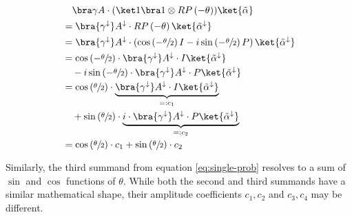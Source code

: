 \begin{equation}
    \label{eq:single-prob-simplification1}
    \begin{split}
            &\quad \bra\gamma A \cdot (\ket 1 \bra 1 \otimes RP\left(-\theta\right)) \ket{\tilde\alpha} \\
            &= \bra{\gamma^\downarrow} A^\downarrow \cdot RP\left(-\theta\right) \ket{\tilde\alpha^\downarrow} \\
            &= \bra{\gamma^\downarrow} A^\downarrow \cdot \left(\cos\left(-\sfrac\theta2\right) I - i \sin\left(-\sfrac\theta2\right) P\right) \ket{\tilde\alpha^\downarrow} \\
            &= \cos\left(-\sfrac\theta2\right) \cdot \bra{\gamma^\downarrow} A^\downarrow \cdot I \ket{\tilde\alpha^\downarrow} \\
                &\quad - i \sin\left(-\sfrac\theta2\right) \cdot \bra{\gamma^\downarrow} A^\downarrow \cdot P \ket{\tilde\alpha^\downarrow} \\
            &= \cos\left(\sfrac\theta2\right) \cdot \underbrace{\bra{\gamma^\downarrow} A^\downarrow \cdot I \ket{\tilde\alpha^\downarrow}}_{=: c_1} \\
                &\quad + \sin\left(\sfrac\theta2\right) \cdot \underbrace{i \cdot \bra{\gamma^\downarrow} A^\downarrow \cdot P \ket{\tilde\alpha^\downarrow}}_{=: c_2} \\
            &= \cos\left(\sfrac\theta2\right) \cdot c_1 + \sin\left(\sfrac\theta2\right) \cdot c_2
    \end{split}
\end{equation}

Similarly, the third summand from equation \ref{eq:single-prob} resolves to a
sum of $\sin$ and $\cos$ functions of $\theta$.
While both the second and third summands have a similar mathematical shape,
their amplitude coefficients $c_1, c_2$ and $c_3, c_4$ may be different.

